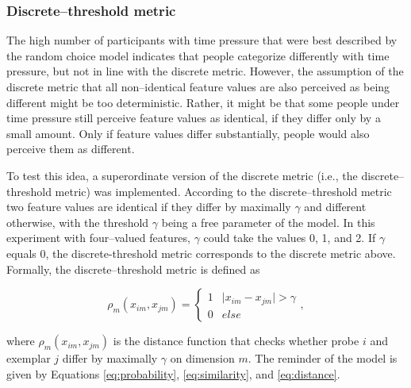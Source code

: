 \documentclass[a4paper,man,natbib]{apa6}
\begin{document}
\subsubsection{Discrete--threshold metric}
The high number of participants with time pressure that were best described by the random choice model indicates that people categorize differently with time pressure, but not in line with the discrete metric. However, the assumption of the discrete metric that all non--identical feature values are also perceived as being different might be too deterministic. Rather, it might be that some people under time pressure still perceive feature values as identical, if they differ only by a small amount. Only if feature values differ substantially, people would also perceive them as different. 

To test this idea, a superordinate version of the discrete metric (i.e., the discrete--threshold metric) was implemented. According to the discrete--threshold metric two feature values are identical if they differ by maximally $\gamma$ and different otherwise, with the threshold $\gamma$ being a free parameter of the model. In this experiment with four--valued features, $\gamma$ could take the values 0, 1, and 2. If $\gamma$ equals 0, the discrete-threshold metric corresponds to the discrete metric above. Formally, the discrete--threshold metric is defined as

\begin{equation}
\rho_{m}(x_{im}, x_{jm}) = 
\begin{cases}
	1 & \mid x_{im} - x_{jm} \mid > \gamma \\
	0 & else 
\end{cases},
\end{equation}

where $\rho_{m}(x_{im}, x_{jm})$ is the distance function that checks whether probe $i$ and exemplar $j$ differ by maximally $\gamma$ on dimension $m$. The reminder of the model is given by Equations \ref{eq:probability}, \ref{eq:similarity}, and \ref{eq:distance}. 
\end{document}
